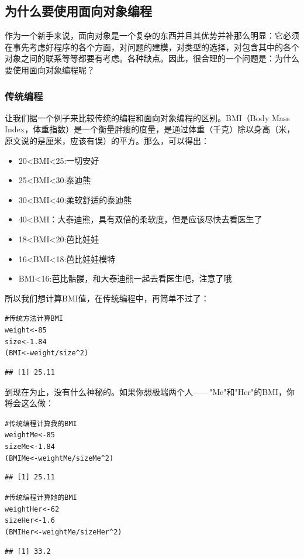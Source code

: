 \documentclass[12pt,a4paper]{article}\usepackage{graphicx, color}
\makeatletter
\newcommand{\hlcomment}[1]{\textcolor[rgb]{0.180392156862745,0.6,0.341176470588235}{#1}}%
\newenvironment{kframe}{%
 \def\at@end@of@kframe{}%
 \ifinner\ifhmode%
  \def\at@end@of@kframe{\end{minipage}}%
  \begin{minipage}{\columnwidth}%
 \fi\fi%
 \def\FrameCommand##1{\hskip\@totalleftmargin \hskip-\fboxsep
 \colorbox{shadecolor}{##1}\hskip-\fboxsep
     \hskip-\linewidth \hskip-\@totalleftmargin \hskip\columnwidth}%
 \MakeFramed {\advance\hsize-\width
   \@totalleftmargin\z@ \linewidth\hsize
   \@setminipage}}%
 {\par\unskip\endMakeFramed%
 \at@end@of@kframe}
\newenvironment{knitrout}{}{} %
\makeatother
\begin{document}
\subsection{为什么要使用面向对象编程}
作为一个新手来说，面向对象是一个复杂的东西并且其优势并补那么明显：它必须在事先考虑好程序的各个方面，对问题的建模，对类型的选择，对包含其中的各个对象之间的联系等等都要有考虑。各种缺点。因此，很合理的一个问题是：为什么要使用面向对象编程呢？
\subsubsection{传统编程}
让我们据一个例子来比较传统的编程和面向对象编程的区别。BMI（Body Mass Index，体重指数）是一个衡量胖瘦的度量，是通过体重（千克）除以身高（米，原文说的是厘米，应该有误）的平方。那么，可以得出：
\begin{itemize}
  \item 20<BMI<25:一切安好
  \item 25<BMI<30:泰迪熊
  \item 30<BMI<40:柔软舒适的泰迪熊
  \item 40<BMI：大泰迪熊，具有双倍的柔软度，但是应该尽快去看医生了
  \item 18<BMI<20:芭比娃娃
  \item 16<BMI<18:芭比娃娃模特
  \item BMI<16:芭比骷髅，和大泰迪熊一起去看医生吧，注意了哦
\end{itemize}
所以我们想计算BMI值，在传统编程中，再简单不过了：
\begin{knitrout}
\color{fgcolor}\begin{kframe}
\begin{alltt}
\hlcomment{# 传统方法计算BMI}
weight <- 85
size <- 1.84
(BMI <- weight/size^2)
\end{alltt}
\begin{verbatim}
## [1] 25.11
\end{verbatim}
\end{kframe}
\end{knitrout}

到现在为止，没有什么神秘的。如果你想极端两个人——"Me"和"Her"的BMI，你将会这么做：
\begin{knitrout}
\color{fgcolor}\begin{kframe}
\begin{alltt}
\hlcomment{# 传统编程计算我的BMI}
weightMe <- 85
sizeMe <- 1.84
(BMIMe <- weightMe/sizeMe^2)
\end{alltt}
\begin{verbatim}
## [1] 25.11
\end{verbatim}
\begin{alltt}
\hlcomment{# 传统编程计算她的BMI}
weightHer <- 62
sizeHer <- 1.6
(BMIHer <- weightMe/sizeHer^2)
\end{alltt}
\begin{verbatim}
## [1] 33.2
\end{verbatim}
\end{kframe}
\end{knitrout}
\end{document}
